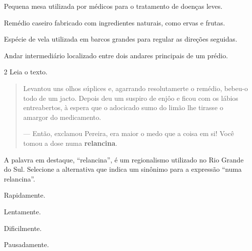 \begin{escolha}
\item Pequena mesa utilizada por médicos para o tratamento de doenças leves.

\item Remédio caseiro fabricado com ingredientes naturais, como ervas e frutas.

\item Espécie de vela utilizada em barcos grandes para regular as direções seguidas.

\item Andar intermediário localizado entre dois andares principais de um prédio.
\end{escolha}

\enlargethispage{\baselineskip}

\pagebreak

\num{2} Leia o texto.

\begin{quote}
Levantou uns olhos súplices e, agarrando resolutamerte o remédio,
bebeu-o todo de um jacto. Depois deu um suspiro de enjôo e ficou com os
lábios entreabertos, à espera que o adocicado sumo do limão lhe tirasse
o amargor do medicamento.

— Então, exclamou Pereira, era maior o medo que a coisa em si! Você
tomou a dose numa \textbf{relancina}.

\end{quote}

A palavra em destaque, “relancina”, é um regionalismo
utilizado no Rio Grande do Sul. Selecione a alternativa que indica um sinônimo
para a expressão “numa relancina”.

\begin{minipage}{.5\textwidth}
\begin{escolha}
\item Rapidamente.

\item Lentamente.

\item Dificilmente.

\item Pausadamente.
\end{escolha}
\end{minipage}

